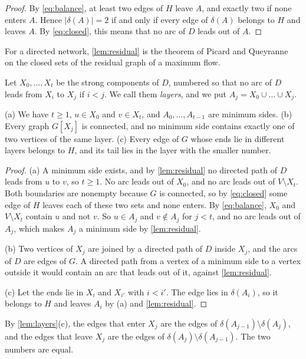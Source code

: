 \begin{proof}
By \eqref{eq:balance}, at least two edges of $H$ leave $A$, and exactly two if none enters $A$.
Hence $|\delta(A)| = 2$ if and only if every edge of $\delta(A)$ belongs to $H$ and leaves $A$.
By \eqref{eq:closed}, this means that no arc of $D$ leads out of $A$.
\end{proof}

For a directed network, \cref{lem:residual} is the theorem of Picard and Queyranne~\cite{PicardQueyranne1980} on the closed sets of the residual graph of a maximum flow.

Let $X_0, \dots, X_t$ be the strong components of $D$, numbered so that no arc of $D$ leads from $X_i$ to $X_j$ if $i < j$.
We call them \emph{layers}, and we put $A_j = X_0 \cup \dots \cup X_j$.

\begin{lemma}
\label{lem:layers}
(a) We have $t \geq 1$, $u \in X_0$ and $v \in X_t$, and $A_0, \dots, A_{t-1}$ are minimum sides.
(b) Every graph $G[X_j]$ is connected, and no minimum side contains exactly one of two vertices of the same layer.
(c) Every edge of $G$ whose ends lie in different layers belongs to $H$, and its tail lies in the layer with the smaller number.
\end{lemma}

\begin{proof}
(a) A minimum side exists, and by \cref{lem:residual} no directed path of $D$ leads from $u$ to $v$, so $t \geq 1$.
No arc leads out of $X_0$, and no arc leads out of $V \setminus X_t$.
Both boundaries are nonempty because $G$ is connected, so by \eqref{eq:closed} some edge of $H$ leaves each of these two sets and none enters.
By \eqref{eq:balance}, $X_0$ and $V \setminus X_t$ contain $u$ and not $v$.
So $u \in A_j$ and $v \notin A_j$ for $j < t$, and no arc leads out of $A_j$, which makes $A_j$ a minimum side by \cref{lem:residual}.

(b) Two vertices of $X_j$ are joined by a directed path of $D$ inside $X_j$, and the arcs of $D$ are edges of $G$.
A directed path from a vertex of a minimum side to a vertex outside it would contain an arc that leads out of it, against \cref{lem:residual}.

(c) Let the ends lie in $X_i$ and $X_{i'}$ with $i < i'$.
The edge lies in $\delta(A_i)$, so it belongs to $H$ and leaves $A_i$ by (a) and \cref{lem:residual}.
\end{proof}

By \cref{lem:layers}(c), the edges that enter $X_j$ are the edges of $\delta(A_{j-1}) \setminus \delta(A_j)$, and the edges that leave $X_j$ are the edges of $\delta(A_j) \setminus \delta(A_{j-1})$.
The two numbers are equal.

